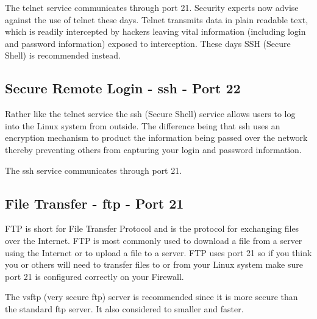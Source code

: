 The telnet service communicates through port 21. Security experts now advise
against the use of telnet these days. Telnet transmits data in plain readable
text, which is readily intercepted by hackers leaving vital information
(including login and password information) exposed to interception. These days
SSH (Secure Shell) is recommended instead. 



\subsectionend

\subsection{Secure Remote Login - ssh - Port 22}
\label{ssec:secure_remote_login_ssh_port_22}

Rather like the telnet service the ssh (Secure Shell)  service allows users to
log into the Linux system from outside. The difference being that ssh uses an
encryption mechanism to product the information being passed over the network
thereby preventing others from capturing your login and password information.



The ssh service communicates through port 21.



\subsectionend

\subsection{File Transfer - ftp - Port 21}
\label{ssec:file_transfer_ftp_port_21}

FTP is short for File Transfer Protocol and is the protocol for exchanging files
over the Internet. FTP is most commonly used to download a file from a server
using the Internet or to upload a file to a server. FTP uses port 21 so if you
think you or others will need to transfer files to or from your Linux system
make sure port 21 is configured correctly on your Firewall. 



The vsftp (very secure ftp) server is recommended since it is more secure than
the standard ftp server. It also considered to smaller and faster.



\subsectionend


